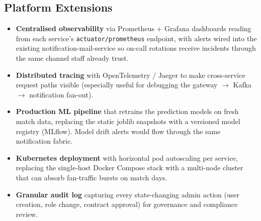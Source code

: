 \documentclass[12pt,a4paper,oneside]{report}
\begin{document}
\subsection*{Platform Extensions}
\begin{itemize}[leftmargin=*]
  \item \textbf{Centralised observability} via Prometheus + Grafana
        dashboards reading from each service's \texttt{actuator/prometheus}
        endpoint, with alerts wired into the existing
        notification-mail-service so on-call rotations receive
        incidents through the same channel staff already trust.
  \item \textbf{Distributed tracing} with OpenTelemetry / Jaeger to
        make cross-service request paths visible (especially useful
        for debugging the gateway $\to$ Kafka $\to$ notification
        fan-out).
  \item \textbf{Production ML pipeline} that retrains the prediction
        models on fresh match data, replacing the static joblib
        snapshots with a versioned model registry (MLflow). Model
        drift alerts would flow through the same notification
        fabric.
  \item \textbf{Kubernetes deployment} with horizontal pod autoscaling
        per service, replacing the single-host Docker Compose stack
        with a multi-node cluster that can absorb fan-traffic bursts
        on match days.
  \item \textbf{Granular audit log} capturing every state-changing
        admin action (user creation, role change, contract approval)
        for governance and compliance review.
\end{itemize}
\end{document}
